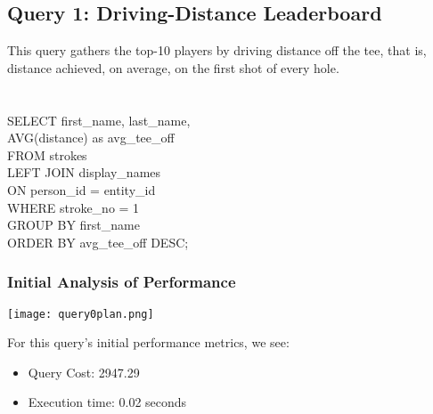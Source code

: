 \documentclass[titlepage]{article}
\begin{document}
\subsection{Query 1: Driving-Distance Leaderboard}
\vspace{1em}
This query gathers the top-10 players by driving distance off the tee, that is, distance achieved, on average, on the
first shot of every hole. \\ \\ \\
\hspace{15pt}SELECT first\_name, last\_name, \\
\hspace{15pt}AVG(distance) as avg\_tee\_off \\
\hspace{15pt}FROM strokes \\
\hspace{15pt}LEFT JOIN display\_names \\
\hspace{15pt}ON person\_id = entity\_id \\
\hspace{15pt}WHERE stroke\_no = 1 \\
\hspace{15pt}GROUP BY first\_name \\
\hspace{15pt}ORDER BY avg\_tee\_off DESC; \\

\vspace{1em}

\subsubsection{Initial Analysis of Performance}
\vspace{1em}
\begin{center}
  \texttt{[image: query0plan.png]}
\end{center}
\vspace{1em}
For this query's initial performance metrics, we see:
\begin{itemize}
  \item Query Cost: 2947.29
  \item Execution time: 0.02 seconds
\end{itemize}
\vspace{1em}
\end{document}
